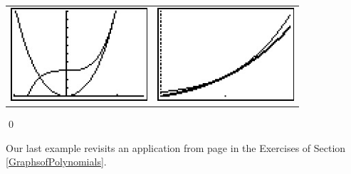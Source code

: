 \begin{ex}
\begin{enumerate}
\begin{center}

\begin{tabular}{cc}

\includegraphics[width=2in]{./PolynomialsGraphics/RealZero07.jpg} \hspace{0.75in} & \includegraphics[width=2in]{./PolynomialsGraphics/RealZero08.jpg}

\end{tabular}
\end{center} 

\qed
\end{enumerate}

\end{ex}

Our last example revisits an application from page \pageref{LCDmaxprofit} in the Exercises of Section \ref{GraphsofPolynomials}.

